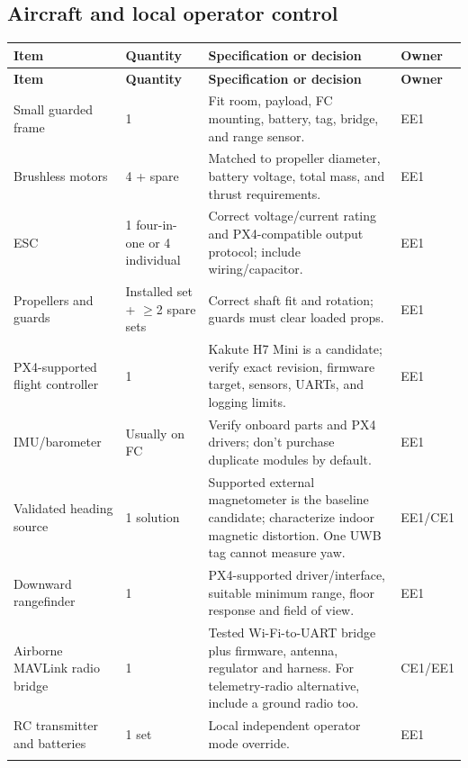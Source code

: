 \documentclass[10pt,letterpaper]{article}
\begin{document}
\subsection{Aircraft and local operator control}
\begingroup\small\begin{longtable}{P{1.562in}P{0.781in}P{3.383in}P{0.781in}}
\toprule{}\textbf{Item} & \textbf{Quantity} & \textbf{Specification or decision} & \textbf{Owner} \\\midrule\endfirsthead
\toprule{}\textbf{Item} & \textbf{Quantity} & \textbf{Specification or decision} & \textbf{Owner} \\\midrule\endhead
\bottomrule\endfoot
Small guarded frame & 1 & Fit room, payload, FC mounting, battery, tag, bridge, and range sensor. & EE1 \\ \addlinespace[2pt]
Brushless motors & 4 + spare & Matched to propeller diameter, battery voltage, total mass, and thrust requirements. & EE1 \\ \addlinespace[2pt]
ESC & 1 four-in-one or 4 individual & Correct voltage/current rating and PX4-compatible output protocol; include wiring/capacitor. & EE1 \\ \addlinespace[2pt]
Propellers and guards & Installed set + $\geq$2 spare sets & Correct shaft fit and rotation; guards must clear loaded props. & EE1 \\ \addlinespace[2pt]
PX4-supported flight controller & 1 & Kakute H7 Mini is a candidate; verify exact revision, firmware target, sensors, UARTs, and logging limits. & EE1 \\ \addlinespace[2pt]
IMU/barometer & Usually on FC & Verify onboard parts and PX4 drivers; don't purchase duplicate modules by default. & EE1 \\ \addlinespace[2pt]
Validated heading source & 1 solution & Supported external magnetometer is the baseline candidate; characterize indoor magnetic distortion. One UWB tag cannot measure yaw. & EE1/CE1 \\ \addlinespace[2pt]
Downward rangefinder & 1 & PX4-supported driver/interface, suitable minimum range, floor response and field of view. & EE1 \\ \addlinespace[2pt]
Airborne MAVLink radio bridge & 1 & Tested Wi-Fi-to-UART bridge plus firmware, antenna, regulator and harness. For telemetry-radio alternative, include a ground radio too. & CE1/EE1 \\ \addlinespace[2pt]
RC transmitter and batteries & 1 set & Local independent operator mode override. & EE1 \\ \addlinespace[2pt]

\end{longtable}
\end{document}

